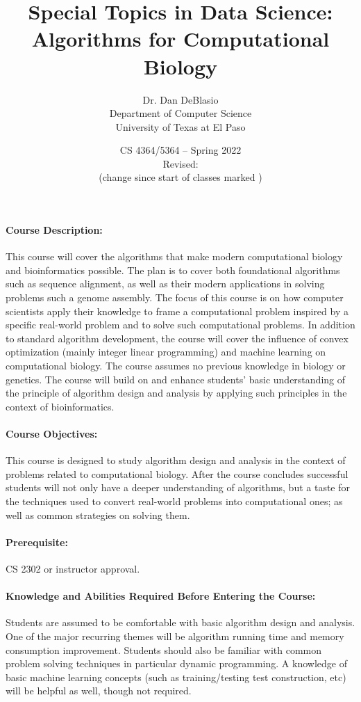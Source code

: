 \documentclass[12pt]{scrartcl}
\title{\large Special Topics in Data Science: \\
\LARGE Algorithms for Computational  Biology}\let\Title\@title
\subtitle{
{\small
\vskip0.5cm
Dr. Dan DeBlasio\\
Department of Computer Science \\
University of Texas at El Paso}
\vskip-1cm}
\date{\small CS 4364/5364 -- Spring 2022\\Revised: \add{\today}\\(change since start of classes marked \add{in orange})}
\begin{document}

\maketitle


\paragraph{Course Description:} 
This course will cover the algorithms that make modern computational biology and bioinformatics possible. 
The plan is to cover both foundational algorithms such as sequence alignment, 
as well as their modern applications in solving problems such a genome assembly. 
The focus of this course is on how computer scientists apply their knowledge to frame a computational problem inspired by a specific real-world problem 
and to solve such computational problems. 
In addition to standard algorithm development, 
the course will cover the influence of convex optimization (mainly integer linear programming) and machine learning on computational biology. 
The course assumes no previous knowledge in biology or genetics. 
The course will build on and enhance students’ basic understanding of the principle of algorithm design and analysis by applying such principles in the context of bioinformatics.


\paragraph{Course Objectives:} This course is designed to study algorithm design and analysis in the context of problems related to computational biology. 
After the course concludes successful students will not only have a deeper understanding of algorithms, but a taste for the techniques used to convert real-world problems into computational ones;
as well as common strategies on solving them. 


\paragraph{Prerequisite:} CS 2302 or instructor approval. 

\paragraph{Knowledge and Abilities Required Before Entering the Course:} Students are assumed to be comfortable with basic algorithm design and analysis. 
One of the major recurring themes will be algorithm running time and memory consumption improvement. 
Students should also be familiar with common problem solving techniques in particular dynamic programming.
A knowledge of basic machine learning concepts (such as training/testing test construction, etc) will be helpful as well, though not required. 
\end{document}
